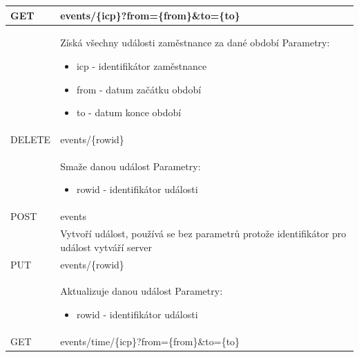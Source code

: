 \documentclass{diplomka}
\begin{document}
\renewcommand{\arraystretch}{1.5}

\begin{center}
\begin{longtable}[H]{| m{2cm} |  m{10cm} |}
\hline
\rowcolor{Gray}
GET & events/\{icp\}?from=\{from\}\&to=\{to\} \\ \hline

&  \parbox{10cm}{\vspace{5 mm}Získá všechny události zaměstnance za dané období\\
Parametry:\begin{itemize}[noitemsep,nolistsep]
\item icp - identifikátor zaměstnance
\item from - datum začátku období
\item to - datum konce období
\end{itemize}
\vspace{5 mm}} \\ \hline
{}
DELETE  & events/\{rowid\} \\  \hline
&  \parbox{10cm}{\vspace{5 mm}Smaže danou událost\\
Parametry:\begin{itemize}[noitemsep,nolistsep]
\item rowid - identifikátor události
\end{itemize}
\vspace{5 mm}} \\ \hline
{}
POST  & events \\  \hline
&  \parbox{10cm}{\vspace{5 mm}Vytvoří událost, používá se bez parametrů protože identifikátor pro událost vytváří server
\vspace{5 mm}} \\ \hline
\newpage
\hline
{}
PUT  & events/\{rowid\} \\  \hline
&  \parbox{10cm}{\vspace{5 mm}Aktualizuje danou událost\\
Parametry:\begin{itemize}[noitemsep,nolistsep]
\item rowid - identifikátor události
\end{itemize}
\vspace{5 mm}} \\ \hline
{}
GET & events/time/\{icp\}?from=\{from\}\&to=\{to\} \\ \hline

\end{longtable}
\end{center}
\end{document}
